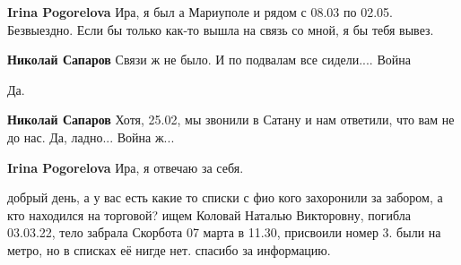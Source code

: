 \begin{itemize} %
\textbf{Irina Pogorelova} Ира, я был а Мариуполе и рядом с 08.03 по 02.05. Безвыездно. Если бы только как-то вышла на связь со мной, я бы тебя вывез.

\textbf{Николай Сапаров} Связи ж не было. И по подвалам все сидели.... Война


Да.

\textbf{Николай Сапаров} Хотя, 25.02, мы звонили в Сатану и нам ответили, что вам не до нас. Да, ладно... Война ж...

\textbf{Irina Pogorelova} Ира, я отвечаю за себя.
\end{itemize} %


добрый день, а у вас есть какие то списки с фио кого захоронили за забором, а
кто находился на торговой? ищем Коловай Наталью Викторовну, погибла 03.03.22,
тело забрала Скорбота 07 марта в 11.30, присвоили номер 3. были на метро, но в
списках её нигде нет. спасибо за информацию.
